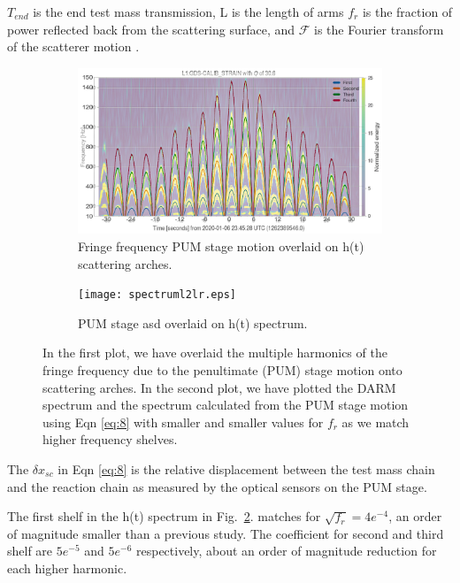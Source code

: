 \documentclass[12pt]{iopart}
\begin{document}
$T_{end}$ is the end test mass transmission, L is the length of arms $f_{r}$ is the fraction of power reflected back from the scattering surface, and $\mathcal{F}$ is the Fourier transform of the scatterer motion \cite{vaj_scat}.
\begin{figure}[h]
   \centering
    \begin{subfigure}[b]{0.45\textwidth}
        \centering
         \includegraphics[width= \textwidth]{fringel2b_lr.jpg}
         \caption{Fringe frequency PUM stage motion overlaid on h(t) scattering arches.}
         \label{fig:fringel2}
    \end{subfigure}
    \hfill
    \begin{subfigure}[b]{0.45\textwidth}
        \centering
         \texttt{[image: spectruml2lr.eps]}
         \caption{PUM stage asd overlaid on h(t) spectrum.}
         \label{fig:spectruml2}
         
    
    \end{subfigure}
    \caption{In the first plot, we have overlaid the multiple harmonics of the fringe frequency due to the penultimate (PUM) stage motion onto scattering arches. In the second plot, we have plotted the DARM spectrum and the spectrum calculated from the PUM stage motion using Eqn \ref{eq:8} with smaller and smaller values for $f_{r}$ as we match higher frequency shelves.}
    \label{fig:fringespectrum}
    
\end{figure}

The $\delta x_{sc} $ in Eqn \ref{eq:8} is the relative displacement between the test mass chain and the reaction chain as measured by the optical sensors on the PUM stage. 

The first shelf in the h(t) spectrum in Fig.~\ref{fig:spectruml2}. matches for $\sqrt{f_{r}} = 4e^{-4}$, an order of magnitude smaller than a previous study\cite{hiro_calc}. The coefficient for second and third shelf are $5e^{-5}$ and $5e^{-6}$ respectively, about an order of magnitude reduction for each higher harmonic.
\end{document}
